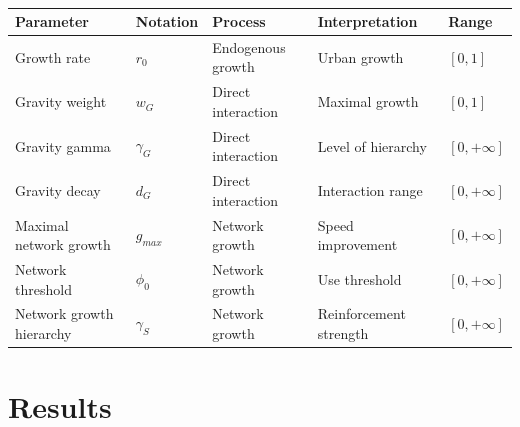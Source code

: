 \begin{table}
\caption{\label{tab:parameters}}	
\begin{tabular}{|l|l|l|l|l|}
\hline
Parameter & Notation & Process & Interpretation & Range\\
\hline
Growth rate & $r_0$ & Endogenous growth & Urban growth & $\left[ 0,1\right]$ \\
Gravity weight & $w_G$ & Direct interaction & Maximal growth & $\left[ 0,1\right]$ \\
Gravity gamma & $\gamma_G$ & Direct interaction & Level of hierarchy & $\left[ 0,+\infty\right]$ \\
Gravity decay & $d_G$ & Direct interaction & Interaction range & $\left[ 0,+\infty\right]$ \\
Maximal network growth & $g_{max}$ & Network growth & Speed improvement & $\left[ 0,+\infty\right]$ \\
Network threshold & $\phi_0$ & Network growth & Use threshold & $\left[ 0,+\infty\right]$ \\
Network growth hierarchy & $\gamma_S$ & Network growth & Reinforcement strength & $\left[ 0,+\infty\right]$ \\
\hline
\end{tabular}
\end{table}



\section{Results}




